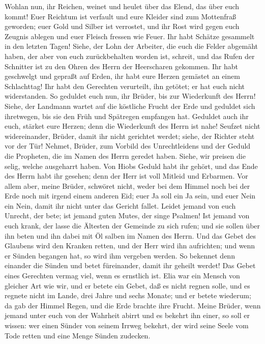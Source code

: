  Wohlan nun, ihr Reichen, weinet und heulet über das
Elend, das über euch kommt!  Euer Reichtum ist verfault
und eure Kleider sind zum Mottenfraß geworden;  euer Gold
und Silber ist verrostet, und ihr Rost wird gegen euch Zeugnis ablegen
und euer Fleisch fressen wie Feuer. Ihr habt Schätze gesammelt in den
letzten Tagen!  Siehe, der Lohn der Arbeiter, die euch die
Felder abgemäht haben, der aber von euch zurückbehalten worden ist,
schreit, und das Rufen der Schnitter ist zu den Ohren des Herrn der
Heerscharen gekommen.  Ihr habt geschwelgt und gepraßt auf
Erden, ihr habt eure Herzen gemästet an einem Schlachttag!
 Ihr habt den Gerechten verurteilt, ihn getötet; er hat
euch nicht widerstanden.  So geduldet euch nun, ihr
Brüder, bis zur Wiederkunft des Herrn! Siehe, der Landmann wartet auf
die köstliche Frucht der Erde und geduldet sich ihretwegen, bis sie den
Früh und Spätregen empfangen hat.  Geduldet auch ihr euch,
stärket eure Herzen; denn die Wiederkunft des Herrn ist nahe!
 Seufzet nicht widereinander, Brüder, damit ihr nicht
gerichtet werdet; siehe, der Richter steht vor der Tür! 
Nehmet, Brüder, zum Vorbild des Unrechtleidens und der Geduld die
Propheten, die im Namen des Herrn geredet haben.  Siehe,
wir preisen die selig, welche ausgeharrt haben. Von Hiobs Geduld habt
ihr gehört, und das Ende des Herrn habt ihr gesehen; denn der Herr ist
voll Mitleid und Erbarmen.  Vor allem aber, meine Brüder,
schwöret nicht, weder bei dem Himmel noch bei der Erde noch mit irgend
einem anderen Eid; euer Ja soll ein Ja sein, und euer Nein ein Nein,
damit ihr nicht unter das Gericht fallet.  Leidet jemand
von euch Unrecht, der bete; ist jemand guten Mutes, der singe Psalmen!
 Ist jemand von euch krank, der lasse die Ältesten der
Gemeinde zu sich rufen; und sie sollen über ihn beten und ihn dabei mit
Öl salben im Namen des Herrn.  Und das Gebet des Glaubens
wird den Kranken retten, und der Herr wird ihn aufrichten; und wenn er
Sünden begangen hat, so wird ihm vergeben werden.  So
bekennet denn einander die Sünden und betet füreinander, damit ihr
geheilt werdet! Das Gebet eines Gerechten vermag viel, wenn es ernstlich
ist.  Elia war ein Mensch von gleicher Art wie wir, und
er betete ein Gebet, daß es nicht regnen solle, und es regnete nicht im
Lande, drei Jahre und sechs Monate;  und er betete
wiederum; da gab der Himmel Regen, und die Erde brachte ihre Frucht.
 Meine Brüder, wenn jemand unter euch von der Wahrheit
abirrt und es bekehrt ihn einer,  so soll er wissen: wer
einen Sünder von seinem Irrweg bekehrt, der wird seine Seele vom Tode
retten und eine Menge Sünden zudecken.
